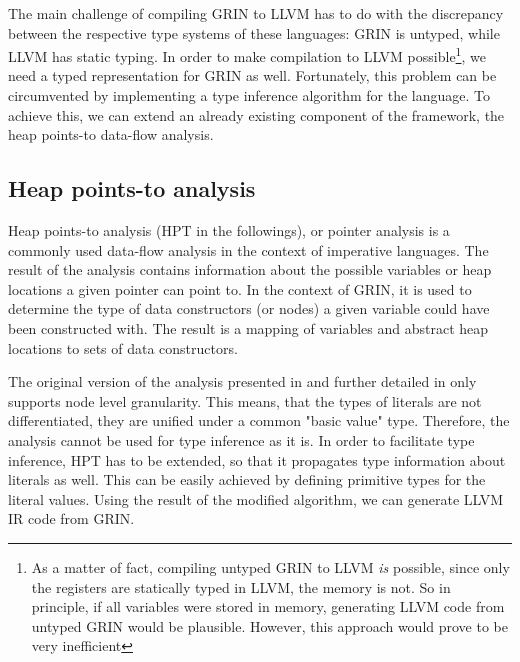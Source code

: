 \documentclass[main.tex]{subfiles}
\begin{document}
	The main challenge of compiling GRIN to LLVM has to do with the discrepancy between the respective type systems of these languages: GRIN is untyped, while LLVM has static typing. In order to make compilation to LLVM possible\footnote{As a matter of fact, compiling untyped GRIN to LLVM \emph{is} possible, since only the registers are statically typed in LLVM, the memory is not. So in principle, if all variables were stored in memory, generating LLVM code from untyped GRIN would be plausible. However, this approach would prove to be very inefficient}, we need a typed representation for GRIN as well. Fortunately, this problem can be circumvented by implementing a type inference algorithm for the language. To achieve this, we can extend an already existing component of the framework, the heap points-to data-flow analysis.
	
	\subsection{Heap points-to analysis}
	
	Heap points-to analysis (HPT in the followings), or pointer analysis is a commonly used data-flow analysis in the context of imperative languages. The result of the analysis contains information about the possible variables or heap locations a given pointer can point to. In the context of GRIN, it is used to determine the type of data constructors (or nodes) a given variable could have been constructed with. The result is a mapping of variables and abstract heap locations to sets of data constructors.
	
	
	The original version of the analysis presented in \cite{boquist-phd} and further detailed in \cite{boquist-grin} only supports node level granularity. This means, that the types of literals are not differentiated, they are unified under a common "basic value" type. Therefore, the analysis cannot be used for type inference as it is. In order to facilitate type inference, HPT has to be extended, so that it propagates type information about literals as well. This can be easily achieved by defining primitive types for the literal values. Using the result of the modified algorithm, we can generate LLVM IR code from GRIN.
	
	
\end{document}
